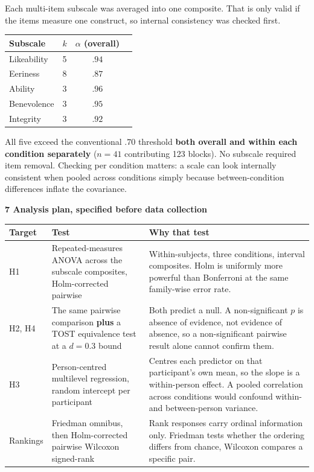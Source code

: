 \documentclass[10pt,a4paper]{article}
\newcommand{\sect}[1]{%
  \needspace{4\baselineskip}\vspace{0.7em}
  \noindent\colorbox{knblue}{\parbox{0.978\textwidth}{\vspace{1pt}\color{white}\textbf{#1}\vspace{1pt}}}
  \vspace{0.3em}\par}
\newcommand{\key}[1]{{\color{knblue}\textbf{#1}}}
\begin{document}
Each multi-item subscale was averaged into one composite. That is only valid if the items measure one construct, so internal consistency was checked first.

{\small
\setlength{\tabcolsep}{8pt}\renewcommand{\arraystretch}{1.3}
\begin{tabular}{@{}lccl@{}}
\toprule
\textbf{Subscale} & \textbf{$k$} & \textbf{$\alpha$ (overall)} & \\
\midrule
Likeability & 5 & $.94$ & \\
Eeriness    & 8 & $.87$ & \\
Ability     & 3 & $.96$ & \\
Benevolence & 3 & $.95$ & \\
Integrity   & 3 & $.92$ & \\
\bottomrule
\end{tabular}}

\vspace{0.4em}
All five exceed the conventional $.70$ threshold \key{both overall and within each condition separately} ($n = 41$ contributing 123 blocks). No subscale required item removal. Checking per condition matters: a scale can look internally consistent when pooled across conditions simply because between-condition differences inflate the covariance.

\sect{7 \quad Analysis plan, specified before data collection}

{\small
\setlength{\tabcolsep}{6pt}\renewcommand{\arraystretch}{1.35}
\begin{tabular}{@{}>{\raggedright\arraybackslash}p{}>{\raggedright\arraybackslash}p{}>{\raggedright\arraybackslash}p{}@{}}
\toprule
\textbf{Target} & \textbf{Test} & \textbf{Why that test} \\
\midrule
H1 & Repeated-measures ANOVA across the subscale composites, Holm-corrected pairwise & Within-subjects, three conditions, interval composites. Holm is uniformly more powerful than Bonferroni at the same family-wise error rate. \\
H2, H4 & The same pairwise comparison \textbf{plus} a TOST equivalence test at a $d = 0.3$ bound & Both predict a null. A non-significant $p$ is absence of evidence, not evidence of absence, so a non-significant pairwise result alone cannot confirm them. \\
H3 & Person-centred multilevel regression, random intercept per participant & Centres each predictor on that participant's own mean, so the slope is a within-person effect. A pooled correlation across conditions would confound within- and between-person variance. \\
Rankings & Friedman omnibus, then Holm-corrected pairwise Wilcoxon signed-rank & Rank responses carry ordinal information only. Friedman tests whether the ordering differs from chance, Wilcoxon compares a specific pair. \\
\bottomrule
\end{tabular}}
\end{document}
